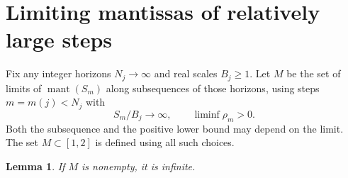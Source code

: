 \documentclass[11pt]{article}
\newtheorem{lemma}[theorem]{Lemma}
\newcommand{\mant}{\operatorname{mant}}
\begin{document}
\section{Limiting mantissas of relatively large steps}
Fix any integer horizons $N_j\to\infty$ and real scales $B_j\ge1$. Let $M$ be the set of limits of $\mant(S_m)$ along subsequences of those horizons, using steps $m=m(j)<N_j$ with
\begin{equation}\label{eq:qualified}
 S_m/B_j\longrightarrow\infty,\qquad \liminf\rho_m>0 .
\end{equation}
Both the subsequence and the positive lower bound may depend on the limit. The set $M\subset[1,2]$ is defined using all such choices.
\begin{lemma}\label{lem:infinite}
If $M$ is nonempty, it is infinite.
\end{lemma}
\end{document}

